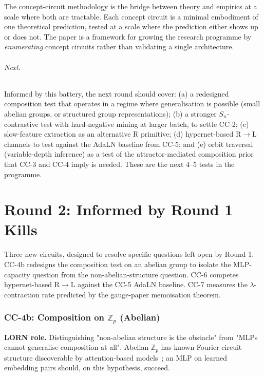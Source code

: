 \documentclass[10pt, twocolumn, a4paper]{article}
\newcommand{\Sn}{S_n}
\begin{document}
The concept-circuit methodology is the bridge between theory and empirics at a scale where both are tractable. Each concept circuit is a minimal embodiment of one theoretical prediction, tested at a scale where the prediction either shows up or does not. The paper is a framework for growing the research programme by \emph{enumerating} concept circuits rather than validating a single architecture.

\paragraph{Next.} Informed by this battery, the next round should cover: (a) a redesigned composition test that operates in a regime where generalisation is possible (small abelian groups, or structured group representations); (b) a stronger $\Sn$-contrastive test with hard-negative mining at larger batch, to settle CC-2; (c) slow-feature extraction as an alternative R primitive; (d) hypernet-based R$\to$L channels to test against the AdaLN baseline from CC-5; and (e) orbit traversal (variable-depth inference) as a test of the attractor-mediated composition prior that CC-3 and CC-4 imply is needed. These are the next 4--5 tests in the programme.


\part*{Round 2: Informed by Round 1 Kills}

Three new circuits, designed to resolve specific questions left open by Round 1. CC-4b redesigns the composition test on an abelian group to isolate the MLP-capacity question from the non-abelian-structure question. CC-6 competes hypernet-based R$\to$L against the CC-5 AdaLN baseline. CC-7 measures the $\lambda$-contraction rate predicted by the gauge-paper memoisation theorem.

\section{CC-4b: Composition on $\mathbb{Z}_p$ (Abelian)}

\textbf{LORN role.} Distinguishing "non-abelian structure is the obstacle" from "MLPs cannot generalise composition at all". Abelian $\mathbb{Z}_p$ has known Fourier circuit structure discoverable by attention-based models~\cite{building-circuits}; an MLP on learned embedding pairs should, on this hypothesis, succeed.
\end{document}
